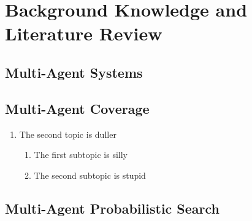 
\chapter{Background Knowledge and Literature Review}
\placeholder{}
\ifpdf
    \graphicspath{{Chapter2/Figs/Raster/}{Chapter2/Figs/PDF/}{Chapter2/Figs/}}
\else
    \graphicspath{{Chapter2/Figs/Vector/}{Chapter2/Figs/}}
\fi


\section[Short title]{Multi-Agent Systems}


\section{Multi-Agent Coverage}

\begin{enumerate}

\item The second topic is duller
\begin{enumerate}
\item The first subtopic is silly
\item The second subtopic is stupid
\end{enumerate}
\end{enumerate}

\section{Multi-Agent Probabilistic Search}

\begin{landscape}




\end{landscape}
